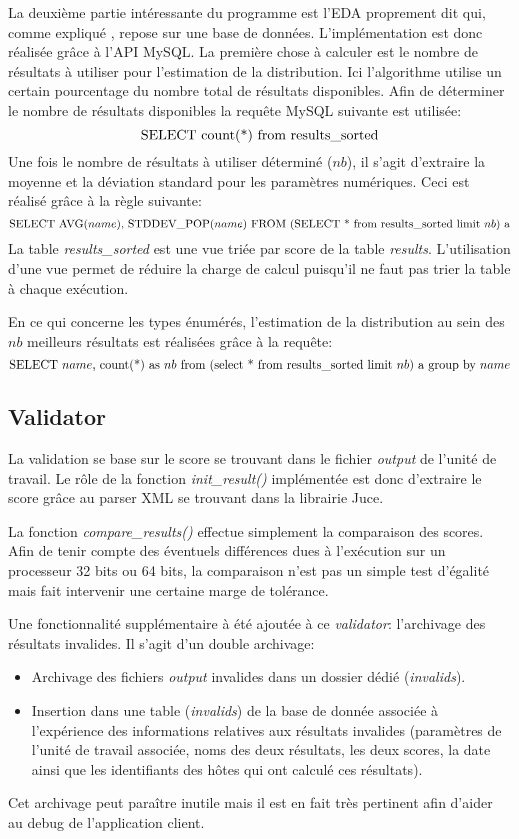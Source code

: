 \documentclass[a4paper, 11pt]{report}
\begin{document}
La deuxième partie intéressante du programme est l'EDA proprement dit qui, comme expliqué %
, repose sur une base de données. L'implémentation est donc réalisée grâce à l'API MySQL. La première chose à calculer est le nombre de résultats à utiliser pour l'estimation de la distribution. Ici l'algorithme utilise un certain pourcentage du nombre total de résultats disponibles. Afin de déterminer le nombre de résultats disponibles la requête MySQL suivante est utilisée:%
$$\textnormal{SELECT count(*) from results\_sorted}$$
Une fois le nombre de résultats à utiliser déterminé ($nb$), il s'agit d'extraire la moyenne et la déviation standard pour les paramètres numériques. Ceci est réalisé grâce à la règle suivante:
$$\textnormal{SELECT AVG(}name\textnormal{), STDDEV\_POP(}name\textnormal{) FROM (SELECT * from results\_sorted limit }nb\textnormal{) a}$$ %
La table \textit{results\_sorted} est une vue triée par score de la table \textit{results}. L'utilisation d'une vue permet de réduire la charge de calcul puisqu'il ne faut pas trier la table à chaque exécution.

En ce qui concerne les types énumérés, l'estimation de la distribution au sein des $nb$ meilleurs résultats est réalisées grâce à la requête:
$$\textnormal{SELECT }name\textnormal{, count(*) as }nb\textnormal{ from (select * from results\_sorted limit }nb\textnormal{) a group by }name$$

\subsection{Validator}
La validation se base sur le score se trouvant dans le fichier \textit{output} de l'unité de travail. Le rôle de la fonction \textit{init\_result()} implémentée est donc d'extraire le score grâce au parser XML se trouvant dans la librairie Juce.

La fonction \textit{compare\_results()} effectue simplement la comparaison des scores. Afin de tenir compte des éventuels différences dues à l'exécution sur un processeur 32 bits ou 64 bits, la comparaison n'est pas un simple test d'égalité mais fait intervenir une certaine marge de tolérance.

Une fonctionnalité supplémentaire à été ajoutée à ce \textit{validator}: l'archivage des résultats invalides. Il s'agit d'un double archivage:
\begin{itemize}
\item Archivage des fichiers \textit{output} invalides dans un dossier dédié (\textit{invalids}).
\item Insertion dans une table (\textit{invalids}) de la base de donnée associée à l'expérience des informations relatives aux résultats invalides (paramètres de l'unité de travail associée, noms des deux résultats, les deux scores, la date ainsi que les identifiants des hôtes qui ont calculé ces résultats).
\end{itemize}
Cet archivage peut paraître inutile mais il est en fait très pertinent afin d'aider au debug de l'application client.
\end{document}
